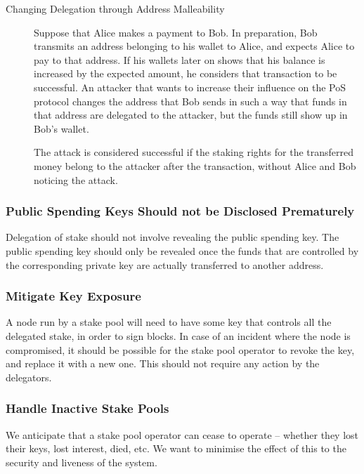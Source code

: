 \documentclass[11pt,a4paper]{article}
\begin{document}
\begin{description}
\item[Changing Delegation through Address Malleability]
Suppose that Alice makes a payment to Bob. In preparation, Bob transmits
an address belonging to his wallet to Alice, and expects Alice to pay to
that address. If his wallets later on shows that his balance is
increased by the expected amount, he considers that transaction to be
successful. An attacker that wants to increase their influence on the
PoS protocol changes the address that Bob sends in such a way that funds
in that address are delegated to the attacker, but the funds still show
up in Bob's wallet.

The attack is considered successful if the staking rights for the
transferred money belong to the attacker after the transaction, without
Alice and Bob noticing the attack.
\end{description}

\subsubsection{Public Spending Keys Should not be Disclosed Prematurely}
\label{public-spending-keys-should-not-be-disclosed-prematurely}

Delegation of stake should not involve revealing the public spending
key. The public spending key should only be revealed once the funds that
are controlled by the corresponding private key are actually transferred
to another address.

\subsubsection{Mitigate Key Exposure}
\label{mitigate-key-exposure}

A node run by a stake pool will need to have some key that controls all
the delegated stake, in order to sign blocks. In case of an incident
where the node is compromised, it should be possible for the stake pool
operator to revoke the key, and replace it with a new one. This should
not require any action by the delegators.

\subsubsection{Handle Inactive Stake Pools}
\label{handle-inactive-stake-pools}

We anticipate that a stake pool operator can cease to operate -- whether
they lost their keys, lost interest, died, etc. We want to minimise the
effect of this to the security and liveness of the system.
\end{document}
